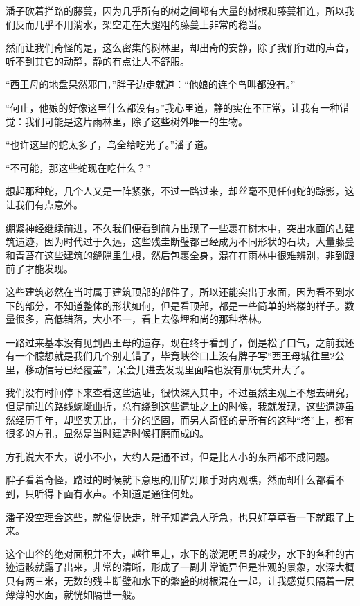 潘子砍着拦路的藤蔓，因为几乎所有的树之间都有大量的树根和藤蔓相连，所以我们反而几乎不用淌水，架空走在大腿粗的藤蔓上非常的稳当。

然而让我们奇怪的是，这么密集的树林里，却出奇的安静，除了我们行进的声音，听不到其它的动静，静的有点让人不舒服。

“西王母的地盘果然邪门，”胖子边走就道：“他娘的连个鸟叫都没有。”

“何止，他娘的好像这里什么都没有。”我心里道，静的实在不正常，让我有一种错觉：我们可能是这片雨林里，除了这些树外唯一的生物。

“也许这里的蛇太多了，鸟全给吃光了。”潘子道。

“不可能，那这些蛇现在吃什么？”

想起那种蛇，几个人又是一阵紧张，不过一路过来，却丝毫不见任何蛇的踪影，这让我们有点意外。

绷紧神经继续前进，不久我们便看到前方出现了一些裹在树木中，突出水面的古建筑遗迹，因为时代过于久远，这些残圭断璧都已经成为不同形状的石块，大量藤蔓和青苔在这些建筑的缝隙里生根，然后包裹全身，混在在雨林中很难辨别，非到跟前了才能发现。

这些建筑必然在当时属于建筑顶部的部件了，所以还能突出于水面，因为看不到水下的部分，不知道整体的形状如何，但是看顶部，都是一些简单的塔楼的样子。数量很多，高低错落，大小不一，看上去像埋和尚的那种塔林。

一路过来基本没有见到西王母的遗存，现在终于看到了，倒是松了口气，之前我还有一个臆想就是我们几个别走错了，毕竟峡谷口上没有牌子写“西王母城往里2公里，移动信号已经覆盖”，呆会儿进去发现里面啥也没有那玩笑开大了。

我们没有时间停下来查看这些遗址，很快深入其中，不过虽然主观上不想去研究，但是前进的路线蜿蜒曲折，总有绕到这些遗址之上的时候，我就发现，这些遗迹虽然经历千年，却坚实无比，十分的坚固，而另人奇怪的是所有的这种“塔”上，都有很多的方孔，显然是当时建造时候打磨而成的。

方孔说大不大，说小不小，大约人是通不过，但是比人小的东西都不成问题。

胖子看着奇怪，路过的时候就下意思的用矿灯顺手对内观瞧，然而却什么都看不到，只听得下面有水声。不知道是通往何处。

潘子没空理会这些，就催促快走，胖子知道急人所急，也只好草草看一下就跟了上来。

这个山谷的绝对面积并不大，越往里走，水下的淤泥明显的减少，水下的各种的古迹遗骸就露了出来，非常的清晰，形成了一副非常诡异但是壮观的景象，水深大概只有两三米，无数的残圭断璧和水下的繁盛的树根混在一起，让我感觉只隔着一层薄薄的水面，就恍如隔世一般。

